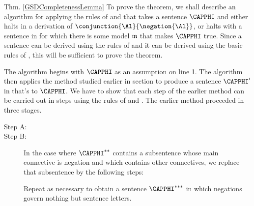 \begin{PROOFOF}{Thm. \ref{GSDCompletenessLemma}}
To prove the theorem, we shall describe an algorithm for applying the rules of \GSDP{} and  that takes a \GSL{} sentence $\CAPPHI$ and either halts in a derivation of $\conjunction{\Al}{\negation{\Al}}$, or halts with a sentence in  for which there is some model $\mathfrak{m}$ that makes $\CAPPHI$ true.
Since a sentence can be derived using the rules of \GSDP{} and  \Iff it can be derived using the basic rules of \GSD{}, this will be sufficient to prove the theorem. 

The algorithm begins with $\CAPPHI$ as an assumption on line 1. 
The algorithm then applies the method studied earlier in section  to produce a sentence $\CAPPHI'$ in  that's  to $\CAPPHI$.
We have to show that each step of the earlier method can be carried out in steps using the rules of \GSDP{} and .
The earlier method proceeded in three stages. 
\begin{description}
\item[Step A:] \hfill
{}

\item[Step B:]
In the case where $\CAPPHI^{**}$ contains a subsentence whose main connective is negation and which contains other connectives, we replace that subsentence by the following steps:
Repeat as necessary to obtain a sentence $\CAPPHI^{***}$ in which negations govern nothing but sentence letters. 


\end{description}
\end{PROOFOF}
